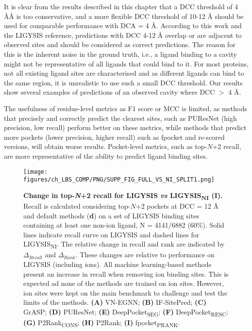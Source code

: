 It is clear from the results described in this chapter that a DCC threshold of 4 \AA{Å} is too conservative, and a more flexible DCC threshold of 10-12 \AA{} should be used for comparable performance with DCA = 4 \AA{}. According to this work and the LIGYSIS reference, predictions with DCC 4-12 \AA{} overlap or are adjacent to observed sites and should be considered as correct predictions. The reason for this is the inherent noise in the ground truth, i.e., a ligand binding to a cavity might not be representative of all ligands that could bind to it. For most proteins, not all existing ligand sites are characterised and as different ligands can bind to the same region, it is unrealistic to use such a small DCC threshold. Our results show several examples of predictions of an observed cavity where DCC $>$ 4 \AA{}.

The usefulness of residue-level metrics as F1 score or MCC is limited, as methods that precisely and correctly predict the clearest sites, such as PUResNet (high precision, low recall) perform better on these metrics, while methods that predict more pockets (lower precision, higher recall) such as fpocket and re-scored versions, will obtain worse results. Pocket-level metrics, such as top-$N$+2 recall, are more representative of the ability to predict ligand binding sites.

\begin{figure}[htb!]
    \centering
    \texttt{[image: figures/ch\_LBS\_COMP/PNG/SUPP\_FIG\_FULL\_VS\_NI\_SPLIT1.png]}
    \caption[Change in top-\textit{N}+2 recall for LIGYSIS \textit{vs} LIGYSIS\textsubscript{NI} (I)]{\textbf{Change in top-\textit{N}+2 recall for LIGYSIS \textit{vs} LIGYSIS\textsubscript{NI} (I).} Recall is calculated considering top-$N$+2 pockets at DCC = 12 \AA{} and default methods (\textbf{d}) on a set of LIGYSIS binding sites containing at least one non-ion ligand, N = 4141/6882 (60\%). Solid lines indicate recall curve on LIGYSIS and dashed lines for LIGYSIS\textsubscript{NI}. The relative change in recall and rank are indicated by $\Delta_{Recall}$ and $\Delta_{Rank}$. These changes are relative to performance on LIGYSIS (including ions). All machine learning-based methods present an increase in recall when removing ion binding sites. This is expected ad none of the methods are trained on ion sites. However, ion sites were kept on the main benchmark to challenge and test the limits of the methods. \textbf{(A)} VN-EGNN; \textbf{(B)} IF-SitePred; \textbf{(C)} GrASP; \textbf{(D)} PUResNet; \textbf{(E)} DeepPocket\textsubscript{SEG}; \textbf{(F)} DeepPocket\textsubscript{RESC}; \textbf{(G)} P2Rank\textsubscript{CONS}; \textbf{(H)} P2Rank; \textbf{(I)} fpocket\textsubscript{PRANK}.}
    \label{fig:LIGYSIS_VS_LIGYSISNI_1}
\end{figure}

